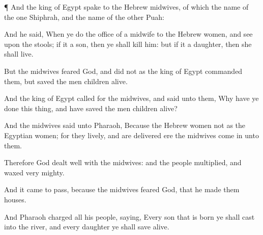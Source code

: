 {\par }{\PP {}¶ And the
king of
Egypt
spake to the
Hebrew
midwives, of which the
name of the
one
{}
Shiphrah, and the
name of the
other
Puah:

And he
said, When ye do the office of a
midwife to the Hebrew
women, and
see
{} upon the
stools; if it
{} a
son, then ye shall
kill him: but if it
{} a
daughter, then she shall
live.

But the
midwives
feared
God, and
did not as the
king of
Egypt
commanded them, but
saved the men
children
alive.

And the
king of
Egypt
called for the
midwives, and
said unto them,
Why have ye
done this
thing, and have
saved the men
children
alive?

And the
midwives
said unto
Pharaoh, Because the
Hebrew
women
{} not as the Egyptian
women; for they
{}
lively, and are
delivered
ere the
midwives come
in unto them.

Therefore
God dealt
well with the
midwives: and the
people
multiplied, and waxed
very
mighty.

And it came to pass, because the
midwives
feared
God, that he
made them
houses.

And
Pharaoh
charged all his
people,
saying, Every
son that is
born ye shall
cast into the
river, and every
daughter ye shall save
alive.




\par }

